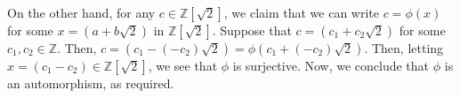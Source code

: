 On the other hand, for any $c \in \mathbb{Z}[\sqrt{2}]$, we claim that we can write $c = \phi(x)$ for some $x = (a + b\sqrt{2})$ in $\mathbb{Z}[\sqrt{2}]$. Suppose that $c = (c_1 + c_2\sqrt{2})$ for some $c_1,c_2 \in \mathbb{Z}$. Then, $c = (c_1 - (-c_2)\sqrt{2}) = \phi(c_1 + (-c_2)\sqrt{2})$. Then, letting $x = (c_1 - c_2) \in \mathbb{Z}[\sqrt{2}]$, we see that $\phi$ is surjective. Now, we conclude that $\phi$ is an automorphism, as required.